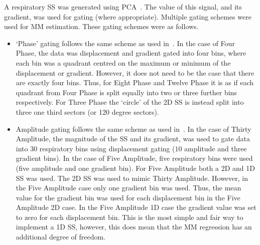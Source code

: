                 A respiratory \gls{SS} was generated using \gls{PCA}~\parencite{Thielemans2011}. The value of this signal, and its gradient, was used for gating (where appropriate). Multiple gating schemes were used for \gls{MM} estimation. These gating schemes were as follows.

                \begin{itemize}
                    \item `Phase' gating follows the same scheme as used in~. In the case of Four Phase, the data was displacement and gradient gated into four bins, where each bin was a quadrant centred on the maximum or minimum of the displacement or gradient. However, it does not need to be the case that there are exactly four bins. Thus, for Eight Phase and Twelve Phase it is as if each quadrant from Four Phase is split equally into two or three further bins respectively. For Three Phase the `circle' of the \gls{2D} \gls{SS} is instead split into three one third sectors (or 120 degree sectors).

                    \item Amplitude gating follows the same scheme as used in~. In the case of Thirty Amplitude,  the magnitude of the \gls{SS} and its gradient, was used to gate data into $30$ respiratory bins using displacement gating ($10$ amplitude and three gradient bins). In the case of Five Amplitude, five respiratory bins were used (five amplitude and one gradient bin). For Five Amplitude both a \gls{2D} and \gls{1D} \gls{SS} was used. The \gls{2D} \gls{SS} was used to mimic Thirty Amplitude. However, in the Five Amplitude case only one gradient bin was used. Thus, the mean value for the gradient bin was used for each displacement bin in the Five Amplitude \gls{2D} case. In the Five Amplitude \gls{1D} case the gradient value was set to zero for each displacement bin. This is the most simple and fair way to implement a \gls{1D} \gls{SS}, however, this does mean that the \gls{MM} regression has an additional degree of freedom.
                \end{itemize}
                
